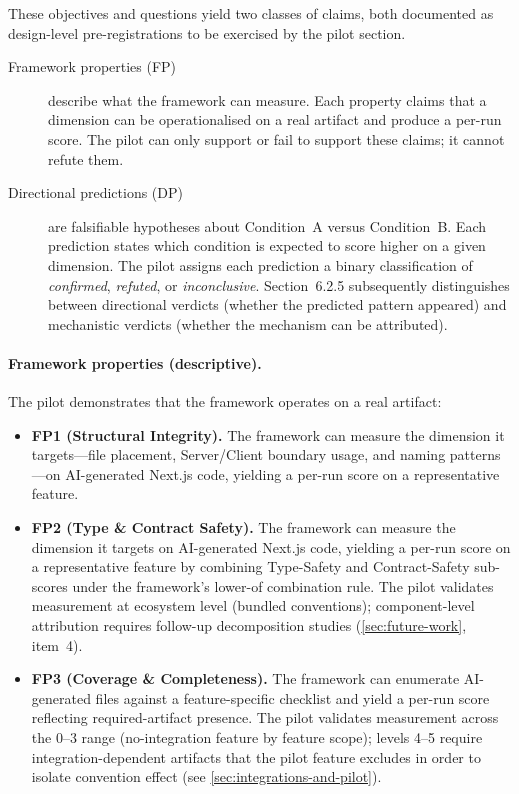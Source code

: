\documentclass[12pt,a4paper]{report}
\begin{document}
These objectives and questions yield two classes of claims, both
documented as design-level pre-registrations to be exercised by the
pilot section.

\begin{description}
  \item[Framework properties (FP)] describe what the framework can
    measure. Each property claims that a dimension can be operationalised
    on a real artifact and produce a per-run score. The pilot can only
    support or fail to support these claims; it cannot refute them.
  \item[Directional predictions (DP)] are falsifiable hypotheses about
    Condition~A versus Condition~B. Each prediction states which
    condition is expected to score higher on a given dimension. The
    pilot assigns each prediction a binary classification of
    \emph{confirmed}, \emph{refuted}, or \emph{inconclusive}.
    Section~6.2.5 subsequently distinguishes between directional verdicts
    (whether the predicted pattern appeared) and mechanistic verdicts
    (whether the mechanism can be attributed).
\end{description}

\paragraph{Framework properties (descriptive).} The pilot demonstrates
that the framework operates on a real artifact:
\begin{itemize}
    \item \textbf{FP1 (Structural Integrity).} The framework can measure
    the dimension it targets---file placement, Server/Client boundary
    usage, and naming patterns---on AI-generated Next.js code, yielding
    a per-run score on a representative feature.
    \item \textbf{FP2 (Type \& Contract Safety).} The framework can measure
    the dimension it targets on AI-generated Next.js code, yielding a
    per-run score on a representative feature by combining Type-Safety
    and Contract-Safety sub-scores under the framework's lower-of
    combination rule. The pilot validates measurement at ecosystem level
    (bundled conventions); component-level attribution requires follow-up
    decomposition studies (\autoref{sec:future-work}, item~4).
    \item \textbf{FP3 (Coverage \& Completeness).} The framework can
enumerate AI-generated files against a feature-specific checklist
and yield a per-run score reflecting required-artifact presence.
The pilot validates measurement across the 0--3 range (no-integration
feature by feature scope); levels 4--5 require integration-dependent artifacts
that the pilot feature excludes in order to isolate convention
effect (see \autoref{sec:integrations-and-pilot}).
\end{itemize}
\end{document}
